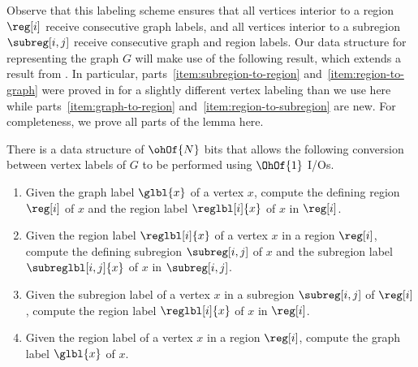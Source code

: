 Observe that this labeling scheme ensures that all vertices interior
to a region $\reg[i]$ receive consecutive graph labels, and all vertices
interior to a subregion $\subreg[i,j]$ receive consecutive graph and
region labels.
Our data structure for representing the graph $G$ will make use of
the following result, which extends a result from \cite{DBLP:journals/talg/BoseCHMM12}.
In particular, parts~\ref{item:subregion-to-region}
and~\ref{item:region-to-graph} were proved in \cite{DBLP:journals/talg/BoseCHMM12} for a slightly
different vertex labeling than we use here while
parts~\ref{item:graph-to-region} and~\ref{item:region-to-subregion} are new.
For completeness, we prove all parts of the lemma here.

\begin{lemma}
  \label{lem:label_ops}
  There is a data structure of $\ohOf{N}$ bits that allows the following
  conversion between vertex labels of $G$ to be performed using
  $\OhOf{1}$ I/Os.
  \begin{enumerate}[label={(\alph{*})},noitemsep]
  \item Given the graph label $\glbl{x}$ of a vertex $x$, compute the defining
    region $\reg[i]$ of $x$ and the region label $\reglbl[i]{x}$ of $x$ in
    $\reg[i]$.\label{item:graph-to-region}
  \item Given the region label $\reglbl[i]{x}$ of a vertex $x$ in a region
    $\reg[i]$, compute the defining subregion $\subreg[i,j]$ of $x$ and the
    subregion label $\subreglbl[i,j]{x}$ of $x$ in
    $\subreg[i,j]$.\label{item:region-to-subregion}
  \item Given the subregion label of a vertex $x$ in a subregion
    $\subreg[i,j]$ of $\reg[i]$, compute the region label $\reglbl[i]{x}$
    of $x$ in $\reg[i]$.\label{item:subregion-to-region}
  \item Given the region label of a vertex $x$ in a region $\reg[i]$,
    compute the graph label $\glbl{x}$ of $x$.\label{item:region-to-graph}
  \end{enumerate}
\end{lemma}

